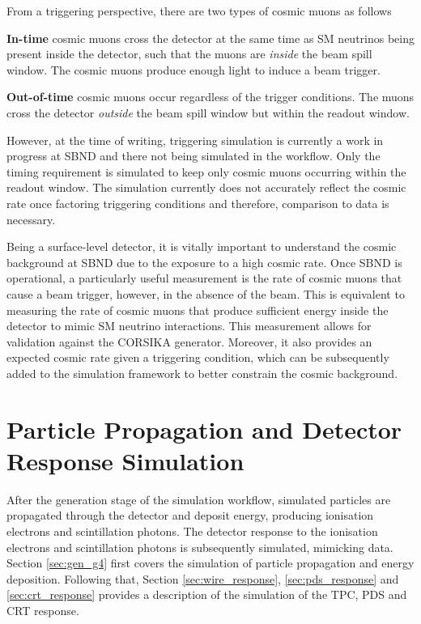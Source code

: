 From a triggering perspective, there are two types of cosmic muons as follows 
\begin{coloritemize}
        \item\textbf{In-time} cosmic muons cross the detector at the same time as SM neutrinos being present inside the detector, such that the muons are \textit{inside} the beam spill window. The cosmic muons produce enough light to induce a beam trigger.                            
        \item\textbf{Out-of-time} cosmic muons occur regardless of the trigger conditions. The muons cross the detector \textit{outside} the beam spill window but within the readout window.  
\end{coloritemize}
However, at the time of writing, triggering simulation is currently a work in progress at SBND and there not being simulated in the workflow. 
Only the timing requirement is simulated to keep only cosmic muons occurring within the readout window.
The simulation currently does not accurately reflect the cosmic rate once factoring triggering conditions and therefore, comparison to data is necessary. 

Being a surface-level detector, it is vitally important to understand the cosmic background at SBND due to the exposure to a high cosmic rate.
Once SBND is operational, a particularly useful measurement is the rate of cosmic muons that cause a beam trigger, however, in the absence of the beam.
This is equivalent to measuring the rate of cosmic muons that produce sufficient energy inside the detector to mimic SM neutrino interactions.
This measurement allows for validation against the CORSIKA generator.
Moreover, it also provides an expected cosmic rate given a triggering condition, which can be subsequently added to the simulation framework to better constrain the cosmic background.                

\section{Particle Propagation and Detector Response Simulation}
\label{sec:gen_response}


After the generation stage of the simulation workflow, simulated particles are propagated through the detector and deposit energy, producing ionisation electrons and scintillation photons.
The detector response to the ionisation electrons and scintillation photons is subsequently simulated, mimicking data. 
Section \ref{sec:gen_g4} first covers the simulation of particle propagation and energy deposition.
Following that, Section \ref{sec:wire_response}, \ref{sec:pds_response} and \ref{sec:crt_response} provides a description of the simulation of the TPC, PDS and CRT response. 

